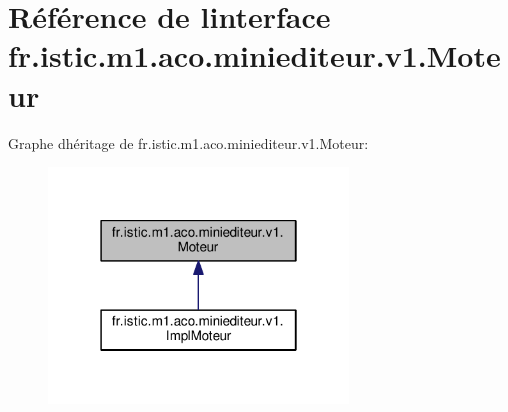 \hypertarget{interfacefr_1_1istic_1_1m1_1_1aco_1_1miniediteur_1_1v1_1_1Moteur}{}\section{Référence de l\textquotesingle{}interface fr.\+istic.\+m1.\+aco.\+miniediteur.\+v1.\+Moteur}
\label{interfacefr_1_1istic_1_1m1_1_1aco_1_1miniediteur_1_1v1_1_1Moteur}


Graphe d\textquotesingle{}héritage de fr.\+istic.\+m1.\+aco.\+miniediteur.\+v1.\+Moteur\+:\nopagebreak
\begin{figure}[H]
\begin{center}
\leavevmode
\includegraphics[width=226pt]{interfacefr_1_1istic_1_1m1_1_1aco_1_1miniediteur_1_1v1_1_1Moteur__inherit__graph}
\end{center}
\end{figure}

